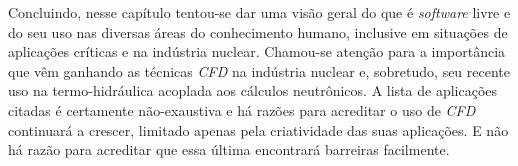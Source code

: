 Concluindo, nesse capítulo tentou-se dar uma visão geral do que é \textit{software} livre e do
seu uso nas diversas áreas do conhecimento humano, inclusive em situações de aplicações
críticas e na indústria nuclear. Chamou-se atenção para a importância que vêm ganhando as
técnicas \textit{CFD} na indústria nuclear e, sobretudo, seu recente uso na termo-hidráulica acoplada aos cálculos
neutrônicos. A lista de aplicações citadas é certamente não-exaustiva e há razões para
acreditar o uso de \textit{CFD} continuará a crescer, limitado apenas pela criatividade
das suas aplicações. E não há razão para acreditar que essa última encontrará barreiras
facilmente.




%

%    
%    







